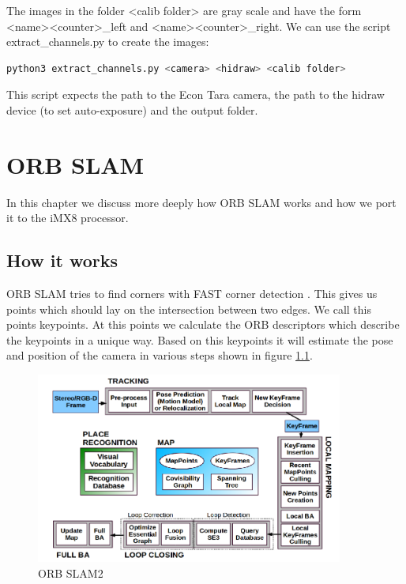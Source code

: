 \documentclass[11pt,a4paper,titlepage,oneside]{report}
\begin{document}
The images in the folder <calib folder> are gray scale and have the form <name><counter>\_left and <name><counter>\_right. We can use the script extract\_channels.py to create the images:
\begin{lstlisting}[language=bash]
python3 extract_channels.py <camera> <hidraw> <calib folder>
\end{lstlisting}
This script expects the path to the Econ Tara camera, the path to the hidraw device (to set auto-exposure) and the output folder.

\chapter{ORB SLAM}\label{chap:implementation}

In this chapter we discuss more deeply how ORB SLAM works and how we port it to the iMX8 processor.

\section{How it works}
ORB SLAM tries to find corners with FAST corner detection \cite{fast}. This gives us points which should lay on the intersection between two edges. We call this points keypoints. At this points we calculate the ORB descriptors \cite{orb} which describe the keypoints in a unique way. Based on this keypoints it will estimate the pose and position of the camera in various steps shown in figure \ref{fig:orb_slam2}.

\begin{figure}[H]
  \begin{center}
		\includegraphics[width=0.9\textwidth]{img/orb_slam2.png}
  \end{center}
	\caption{ORB SLAM2 \cite{orbslam2}}\label{fig:orb_slam2}
\end{figure}
\end{document}
